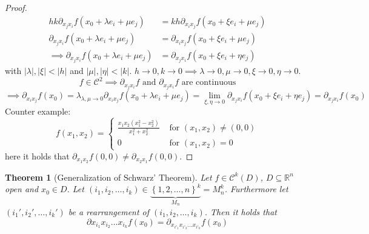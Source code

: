 \documentclass{article}
\newtheorem{theorem}{Theorem}  \numberwithin{theorem}{section}
\newcommand{\set}[1]{\left\{#1\right\}}
\newcommand{\card}[1]{\left|#1\right|}
\begin{document}
\begin{proof}
  \begin{align*}
    hk \partial_{x_j x_i} f(x_0 + \lambda e_i + \mu e_j) &= kh \partial_{x_i x_j} f(x_0 + \xi e_i + \mu e_j) \\
    \partial_{x_j x_i} f(x_0 + \lambda e_i + \mu e_j) &= \partial_{x_i x_j} f(x_0 + \xi e_i + \mu e_j) \\
    \implies \partial_{x_j x_i} f(x_0 + \lambda e_i + \mu e_j) &= \partial_{x_j x_i} f(x_0 + \xi e_i + \eta e_j)
  \end{align*}
  with $\card{\lambda}, \card{\xi} < \card{h}$ and $\card{\mu}, \card{\eta} < \card{k}$.
  $h \to 0, k \to 0 \implies \lambda \to 0, \mu \to 0, \xi \to 0, \eta \to 0$.
  \[ f \in \mathcal C^2 \implies \partial_{x_j x_i} f \text{ and } \partial_{x_j x_i} f \text{ are continuous} \]
  \[
    \implies \partial_{x_i x_j} f(x_0) = \lambda_{\lambda, \mu \to 0} \partial_{x_i x_j} f(x_0 + \lambda e_i + \mu e_j)
    = \lim_{\xi,\eta \to 0} \partial_{x_j x_i} f(x_0 + \xi e_i + \eta e_j) = \partial_{x_j x_i} f(x_0)
  \]
  Counter example:
  \[
    f(x_1, x_2) = \begin{cases}
      \frac{x_1 x_2 (x_1^2 - x_2^2)}{x_1^2 + x_2^2} & \text{ for } (x_1, x_2) \neq (0, 0) \\
      0 & \text{ for } (x_1, x_2) = 0
    \end{cases}
  \]
  here it holds that $\partial_{x_1 x_2} f(0, 0) \neq \partial_{x_2 x_1} f(0, 0)$.
\end{proof}

\begin{theorem}[Generalization of Schwarz' Theorem]
  Let $f \in \mathcal C^k(D)$, $D \subseteq \mathbb R^n$ open and $x_0 \in D$.
  Let $(i_1, i_2, \dots, i_k) \in \underbrace{\set{1,2, \dots, n}^k}_{M_n} = M_n^k$.
  Furthermore let $(i_1', i_2', \dots, i_k')$ be a rearrangement of $(i_1, i_2, \dots, i_k)$.
  Then it holds that
  \[ \partial{x_{i_1} x_{i_2} \dots x_{i_k}} f(x_0) = \partial_{x_{i'_1} x_{i'_2} \dots x_{i'_k}} f(x_0) \]
\end{theorem}
\end{document}
